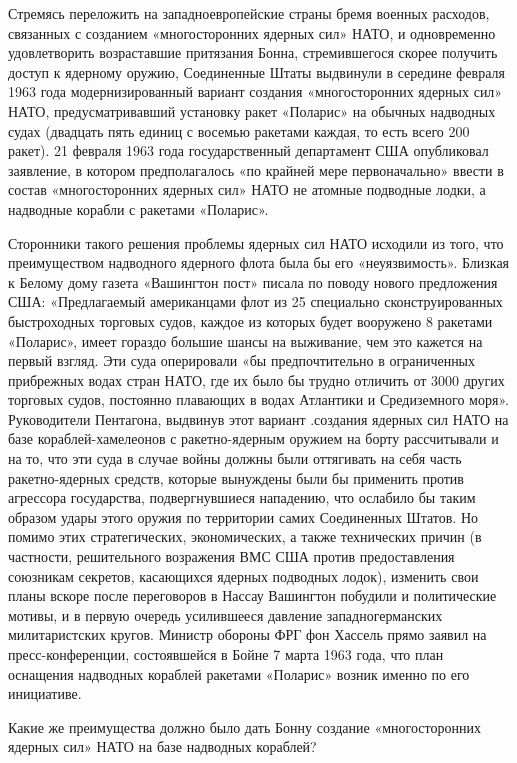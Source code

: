 \documentclass[12pt, a4paper, openany]{book}
\begin{document}
Стремясь переложить на западноевропейские страны бремя военных расходов, связанных с созданием «многосторонних ядерных сил» НАТО, и одновременно удовлетворить возраставшие притязания Бонна, стремившегося скорее получить доступ к ядерному оружию, Соединенные Штаты выдвинули в середине февраля 1963 года модернизированный вариант создания «многосторонних ядерных сил» НАТО, предусматривавший установку ракет «Поларис» на обычных надводных судах (двадцать пять единиц с восемью ракетами каждая, то есть всего 200 ракет). 21 февраля 1963 года государственный департамент США опубликовал заявление, в котором предполагалось «по крайней мере первоначально» ввести в состав «многосторонних ядерных сил» НАТО не атомные подводные лодки, а надводные корабли с ракетами «Поларис».

Сторонники такого решения проблемы ядерных сил НАТО исходили из того, что преимуществом надводного ядерного флота была бы его «неуязвимость». Близкая к Белому дому газета «Вашингтон пост» писала по поводу нового предложения США: «Предлагаемый американцами флот из 25 специально сконструированных быстроходных торговых судов, каждое из которых будет вооружено 8 ракетами «Поларис», имеет гораздо большие шансы на выживание, чем это кажется на первый взгляд. Эти суда оперировали «бы предпочтительно в ограниченных прибрежных водах стран НАТО, где их было бы трудно отличить от 3000 других торговых судов, постоянно плавающих в водах Атлантики и Средиземного моря». Руководители Пентагона, выдвинув этот вариант .создания ядерных сил НАТО на базе кораблей-хамелеонов с ракетно-ядерным оружием на борту рассчитывали и на то, что эти суда в случае войны должны были оттягивать на себя часть ракетно-ядерных средств, которые вынуждены были бы применить против агрессора государства, подвергнувшиеся нападению, что ослабило бы таким образом удары этого оружия по территории самих Соединенных Штатов. Но помимо этих стратегических, экономических, а также технических причин (в частности, решительного возражения ВМС США против предоставления союзникам секретов, касающихся ядерных подводных лодок), изменить свои планы вскоре после переговоров в Нассау Вашингтон побудили и политические мотивы, и в первую очередь усилившееся давление западногерманских милитаристских кругов. Министр обороны ФРГ фон Хассель прямо заявил на пресс-конференции, состоявшейся в Бойне 7 марта 1963 года, что план оснащения надводных кораблей ракетами «Поларис» возник именно по его инициативе.

Какие же преимущества должно было дать Бонну создание «многосторонних ядерных сил» НАТО на базе надводных кораблей?
\end{document}
